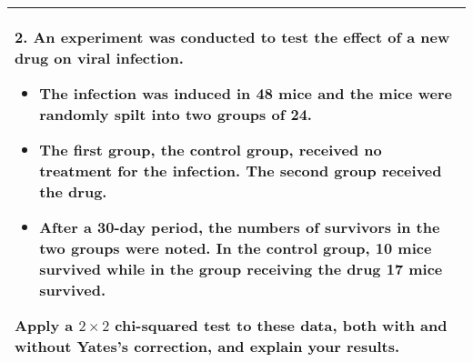 \documentclass[a4paper,12pt]{article}
\begin{document}
\begin{table}[ht!]
     

\centering
     

\begin{tabular}{|p{15cm}|}
     

\hline 

 
 
2. An experiment was conducted to test the effect of a new drug on viral infection.  
\begin{itemize}
    \item The infection was induced in 48 mice and the mice were randomly spilt into two groups of 24.  
\item The first group, the control group, received no treatment for the infection.  The second group received the drug.
\item  After a 30-day period, the numbers of survivors in the two groups were noted. In the control group, 10 mice survived while in the group receiving the drug 17 mice survived. 
\end{itemize}
 Apply a $2 \times 2$ chi-squared test to these data, both with and without Yates's correction, and explain your results. %
\\ \hline


\end{tabular}
    

\end{table}
\end{document}
